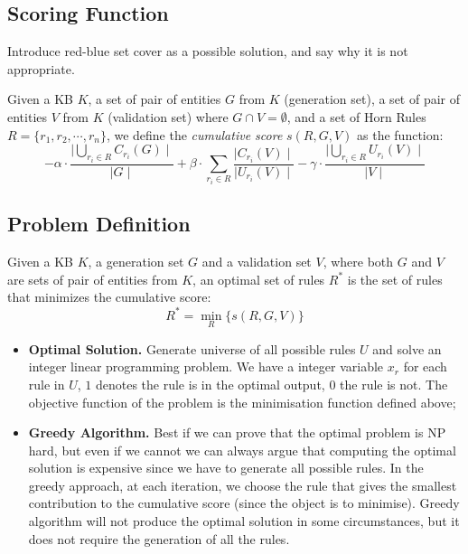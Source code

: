 \subsection{Scoring Function}

{\color{red} Introduce red-blue set cover as a possible solution, and
	say why it is not appropriate.}

Given a KB $K$, a set of pair of entities $G$ from $K$ (generation set), a set of pair of entities $V$ from $K$ (validation set) where $G \cap V = \emptyset$, and a set of Horn Rules $R=\{r_1,r_2,\cdots,r_n\}$, we define the \emph{cumulative score} $s(R,G,V)$ as the function:
\begin{equation*}
-\alpha \cdot \frac{\mid\bigcup\limits_{r_i \in R} C_{r_i}(G)\mid}{\mid G \mid} +\beta \cdot \sum_{r_i \in R}\frac{\mid C_{r_i}(V) \mid}{\mid U_{r_i}(V)\mid}  -\gamma \cdot \frac{\mid\bigcup\limits_{r_i \in R} U_{r_i}(V)\mid}{\mid V \mid}
\end{equation*}

\subsection{Problem Definition}
Given a KB $K$, a generation set $G$ and a validation set $V$, where both $G$ and $V$ are sets of pair of entities from $K$, an optimal set of rules $R^*$ is the set of rules that minimizes the cumulative score:
\begin{equation*}
R^* = \min\limits_{R}\{s(R,G,V)\}
\end{equation*}
\begin{itemize}
\item \textbf{Optimal Solution.} Generate universe of all possible rules $U$ and solve an integer linear programming problem. We have a integer variable $x_r$ for each rule in $U$, $1$ denotes the rule is in the optimal output, $0$ the rule is not. The objective function of the problem is the minimisation function defined above;
\item \textbf{Greedy Algorithm.} Best if we can prove that the optimal problem is NP hard, but even if we cannot we can always argue that computing the optimal solution is expensive since we have to generate all possible rules. In the greedy approach, at each iteration, we choose the rule that gives the smallest contribution to the cumulative score (since the object is to minimise). Greedy algorithm will not produce the optimal solution in some circumstances, but it does not require the generation of all the rules.
\end{itemize}